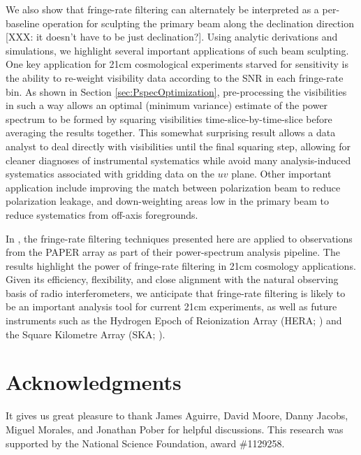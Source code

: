 \documentclass[twocolumn,apj,numberedappendix]{emulateapj}
\begin{document}
We also show that fringe-rate filtering can alternately be interpreted as a per-baseline
operation for sculpting the primary beam along the declination direction [XXX: it doesn't have to be
just declination?].  Using analytic
derivations and simulations, we highlight several important applications of such beam
sculpting.  One key application for 21cm cosmological experiments starved for sensitivity
is the ability to re-weight visibility data according to the SNR in each fringe-rate bin.
As shown in Section \ref{sec:PspecOptimization}, pre-processing the visibilities in such a way
allows an optimal (minimum variance) estimate of the power spectrum to be formed by
squaring visibilities time-slice-by-time-slice before averaging the results together. This
somewhat surprising result allows a data analyst to deal directly with visibilities until
the final squaring step, allowing for cleaner diagnoses of instrumental systematics while
avoid many analysis-induced systematics associated with gridding data on the $uv$ plane.
%
Other important application include improving the match between polarization beam to
reduce polarization leakage, and down-weighting areas low in the primary beam
to reduce systematics from off-axis foregrounds.

In \citet{ali_et_al2015}, the fringe-rate filtering techniques presented here are applied to
observations from the PAPER array as part of their power-spectrum analysis pipeline.  The
results highlight the power of fringe-rate filtering in 21cm cosmology applications.
Given its efficiency, flexibility, and close alignment with the natural observing
basis of radio interferometers, we anticipate that fringe-rate filtering is likely to be
an important analysis tool for current 21cm experiments, as well as future instruments
such as the Hydrogen Epoch of Reionization Array (HERA; \citealt{pober_et_al2014}) and
the Square Kilometre Array (SKA; \citealt{XXX}).


\section{Acknowledgments}

It gives us great pleasure to thank James Aguirre, David Moore, Danny Jacobs, 
Miguel Morales, and Jonathan Pober for helpful discussions.  This research
was supported by the National Science Foundation, award \#1129258.




\end{document}
